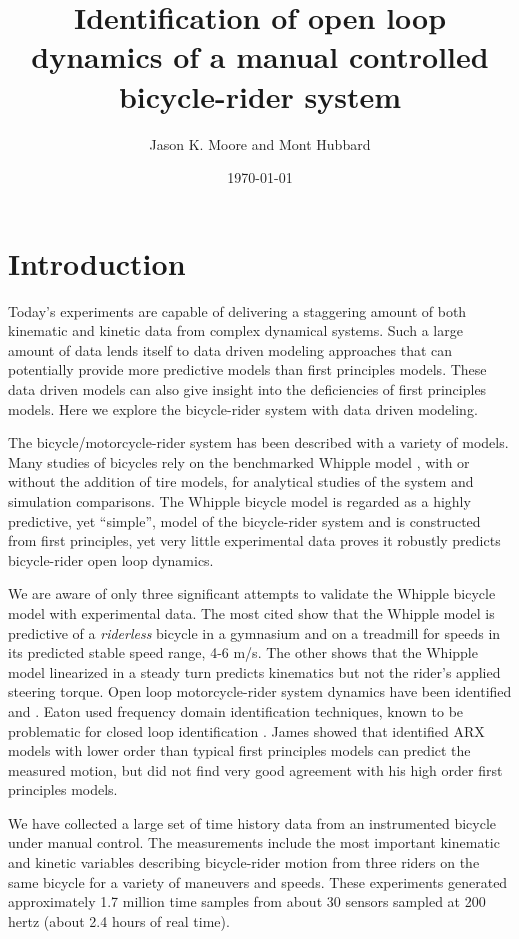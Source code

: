 \documentclass[a4paper]{article}
\title{Identification of open loop dynamics of a manual controlled
bicycle-rider system}
\author{Jason K. Moore and Mont Hubbard}
\date{\today}
\begin{document}
\maketitle

\section*{Introduction}

Today's experiments are capable of delivering a staggering amount of both
kinematic and kinetic data from complex dynamical systems. Such a large amount
of data lends itself to data driven modeling approaches that can potentially
provide more predictive models than first principles models. These data driven
models can also give insight into the deficiencies of first principles models.
Here we explore the bicycle-rider system with data driven modeling.

The bicycle/motorcycle-rider system has been described with a variety of
models. Many studies of bicycles rely on the benchmarked Whipple model
\cite{Meijaard2007}, with or without the addition of tire models, for
analytical studies of the system and simulation comparisons. The Whipple
bicycle model \cite{Whipple1899} is regarded as a highly predictive, yet
``simple'', model of the bicycle-rider system and is constructed from first
principles, yet very little experimental data proves it robustly predicts
bicycle-rider open loop dynamics.

We are aware of only three significant attempts to validate the Whipple bicycle
model with experimental data. The most cited \cite{Kooijman2008,Kooijman2009}
show that the Whipple model is predictive of a \emph{riderless} bicycle in a
gymnasium and on a treadmill for speeds in its predicted stable speed range,
4-6 m/s. The other \cite{Cain2012} shows that the Whipple model linearized in a
steady turn predicts kinematics but not the rider's applied steering torque.
Open loop motorcycle-rider system dynamics have been identified
\cite{Eaton1973} and \cite{James2002,James2005}. Eaton used frequency domain
identification techniques, known to be problematic for closed loop
identification \cite{Ljung1999}. James showed that identified ARX models with
lower order than typical first principles models can predict the measured
motion, but did not find very good agreement with his high order first
principles models.

We have collected a large set of time history data from an instrumented bicycle
under manual control. The measurements include the most important kinematic and
kinetic variables describing bicycle-rider motion from three riders on the same
bicycle for a variety of maneuvers and speeds. These experiments generated
approximately 1.7 million time samples from about 30 sensors sampled at 200
hertz (about 2.4 hours of real time).
\end{document}
